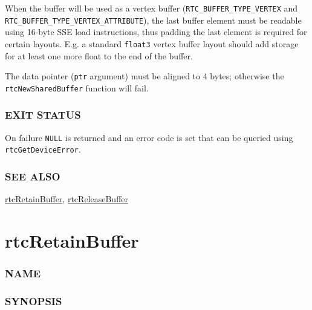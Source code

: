 When the buffer will be used as a vertex buffer
(\texttt{RTC\_BUFFER\_TYPE\_VERTEX} and
\texttt{RTC\_BUFFER\_TYPE\_VERTEX\_ATTRIBUTE}), the last buffer element
must be readable using 16-byte SSE load instructions, thus padding the
last element is required for certain layouts. E.g. a standard
\texttt{float3} vertex buffer layout should add storage for at least one
more float to the end of the buffer.

The data pointer (\texttt{ptr} argument) must be aligned to 4 bytes;
otherwise the \texttt{rtcNewSharedBuffer} function will fail.

\subsubsection{EXIT STATUS}\label{exit-status}

On failure \texttt{NULL} is returned and an error code is set that can
be queried using \texttt{rtcGetDeviceError}.

\subsubsection{SEE ALSO}\label{see-also}

\hyperref[rtcretainbuffer]{rtcRetainBuffer},
\hyperref[rtcreleasebuffer]{rtcReleaseBuffer}

\pagebreak

\section{rtcRetainBuffer}\label{rtcretainbuffer}

\subsubsection{NAME}\label{name}

\begin{Shaded}
\begin{Highlighting}[]
\OperatorTok{{-}}
\end{Highlighting}
\end{Shaded}

\subsubsection{SYNOPSIS}\label{synopsis}

\begin{Shaded}
\begin{Highlighting}[]

\OperatorTok{(}\OperatorTok{);}
\end{Highlighting}
\end{Shaded}


